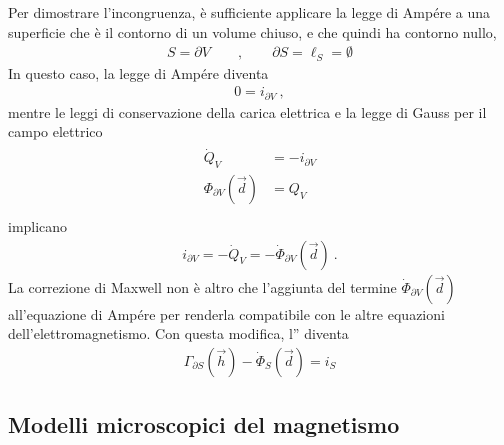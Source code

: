 \documentclass[letterpaper,10pt,italian]{jupyterBook}
\begin{document}
\sphinxAtStartPar
Per dimostrare l’incongruenza, è sufficiente applicare la legge di Ampére a una superficie che è il contorno di un volume chiuso, e che quindi ha contorno nullo,
\begin{equation*}
\begin{split}S = \partial V  \qquad , \qquad  \partial S = \ell_S = \emptyset\end{split}
\end{equation*}
\sphinxAtStartPar
In questo caso, la legge di Ampére diventa
\begin{equation*}
\begin{split}0 = i_{\partial V} \ ,\end{split}
\end{equation*}
\sphinxAtStartPar
mentre le leggi di conservazione della carica elettrica e la legge di Gauss per il campo elettrico
\begin{equation*}
\begin{split}\begin{aligned}
  \dot{Q}_V & = - i_{\partial V} \\
  \Phi_{\partial V}(\vec{d}) & = Q_V \\
\end{aligned}\end{split}
\end{equation*}
\sphinxAtStartPar
implicano
\begin{equation*}
\begin{split}i_{\partial V} = - \dot{Q}_V = - \dot{\Phi}_{\partial V}(\vec{d}) \ .\end{split}
\end{equation*}
\sphinxAtStartPar
La correzione di Maxwell non è altro che l’aggiunta del termine \(\dot{\Phi}_{\partial V}(\vec{d})\) all’equazione di Ampére per renderla compatibile con le altre equazioni dell’elettromagnetismo. Con questa modifica, l” diventa
\begin{equation*}
\begin{split}\Gamma_{\partial S}(\vec{h}) - \dot{\Phi}_{S}(\vec{d}) = i_S \end{split}
\end{equation*}

\subsection{Modelli microscopici del magnetismo}
\label{\detokenize{ch/electromagnetism/electromagnetism-steady:modelli-microscopici-del-magnetismo}}
\end{document}
